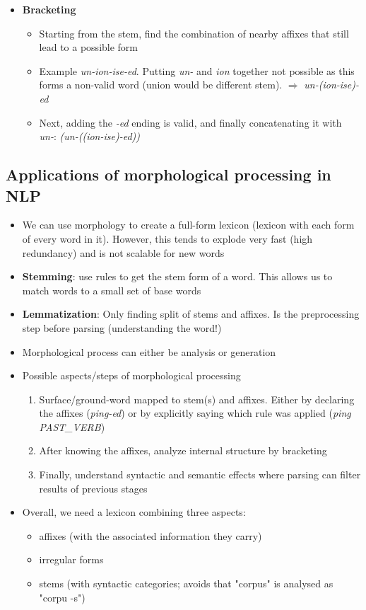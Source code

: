 \begin{itemize}
	\item \textbf{Bracketing}
	\begin{itemize}
		\item Starting from the stem, find the combination of nearby affixes that still lead to a possible form
		\item Example \textit{un-ion-ise-ed}. Putting \textit{un-} and \textit{ion} together not possible as this forms a non-valid word (union would be different stem). $\Rightarrow$ \textit{un-(ion-ise)-ed}
		\item Next, adding the \textit{-ed} ending is valid, and finally concatenating it with \textit{un-}: \textit{(un-((ion-ise)-ed))}
	\end{itemize}
\end{itemize}
\subsection{Applications of morphological processing in NLP}
\begin{itemize}
	\item We can use morphology to create a full-form lexicon (lexicon with each form of every word in it). However, this tends to explode very fast (high redundancy) and is not scalable for new words
	\item \textbf{Stemming}: use rules to get the stem form of a word. This allows us to match words to a small set of base words
	\item \textbf{Lemmatization}: Only finding split of stems and affixes. Is the preprocessing step before parsing (understanding the word!)
	\item Morphological process can either be analysis or generation
	\item Possible aspects/steps of morphological processing
	\begin{enumerate}
		\item Surface/ground-word mapped to stem(s) and affixes. Either by declaring the affixes (\textit{ping-ed}) or by explicitly saying which rule was applied (\textit{ping} \textit{PAST\_VERB})
		\item After knowing the affixes, analyze internal structure by bracketing
		\item Finally, understand syntactic and semantic effects where parsing can filter results of previous stages
	\end{enumerate}
	\item Overall, we need a lexicon combining three aspects:
	\begin{itemize}
		\item affixes (with the associated information they carry)
		\item irregular forms
		\item stems (with syntactic categories; avoids that "corpus" is analysed as "corpu -s")
	\end{itemize}
\end{itemize}
